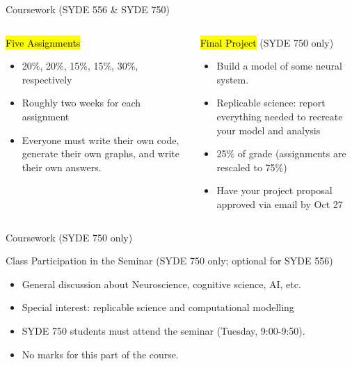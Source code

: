 \documentclass[aspectratio=169]{beamer}
\begin{document}
\begin{frame}{Coursework (SYDE 556 \& SYDE 750)}
	\begin{columns}[t]
		\begin{block}{\hl{Five Assignments}}
		\begin{itemize}
				\item 20\%, 20\%, 15\%, 15\%, 30\%, respectively
				\item Roughly two weeks for each assignment
				\item Everyone must write their own code, generate their own graphs, and write their own answers.
			\end{itemize}
		\end{block}
		\begin{block}{\hl{Final Project} (SYDE 750 only)}
			\begin{itemize}
				\item Build a model of some neural system.
				\item Replicable science: report everything needed to recreate your model and analysis
				\item 25\% of grade (assignments are rescaled to 75\%)
				\item Have your project proposal approved via email by Oct 27
			\end{itemize}
		\end{block}
	\end{columns}
\end{frame}

\begin{frame}{Coursework (SYDE 750 only)}
	\begin{block}{Class Participation in the Seminar  (SYDE 750 only; optional for SYDE 556)}
	\begin{itemize}
		\item General discussion about Neuroscience, cognitive science, AI, etc.
		\item Special interest: replicable science and computational modelling
		\item SYDE 750 students must attend the seminar (Tuesday, 9:00-9:50).
		\item No marks for this part of the course.
	\end{itemize}
	\end{block}
\end{frame}
\end{document}
